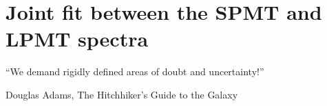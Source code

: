 \documentclass[../main.tex]{subfiles}
\begin{document}
\chapter{Joint fit between the SPMT and LPMT spectra}
\label{sec:joint_fit}

\epigraph{``We demand rigidly defined areas of doubt and uncertainty!''}{Douglas Adams, The Hitchhiker’s Guide to the Galaxy}

\minitoc

%
%
%
%
%
%
%
\end{document}

